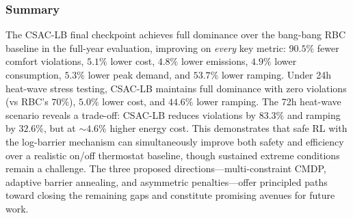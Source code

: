 \subsubsection{Summary}

The CSAC-LB final checkpoint achieves full dominance over the bang-bang RBC
baseline in the full-year evaluation, improving on \emph{every} key metric:
$90.5\%$ fewer comfort violations, $5.1\%$ lower cost, $4.8\%$ lower
emissions, $4.9\%$ lower consumption, $5.3\%$ lower peak demand, and $53.7\%$
lower ramping.  Under 24h heat-wave stress testing, CSAC-LB maintains full
dominance with zero violations (vs RBC's $70\%$), $5.0\%$ lower cost, and
$44.6\%$ lower ramping.  The 72h heat-wave scenario reveals a trade-off:
CSAC-LB reduces violations by $83.3\%$ and ramping by $32.6\%$, but at
$\sim$$4.6\%$ higher energy cost.  This demonstrates that safe RL with the log-barrier
mechanism can simultaneously improve both safety and efficiency over a
realistic on/off thermostat baseline, though sustained extreme conditions
remain a challenge.  The three proposed directions---multi-constraint CMDP,
adaptive barrier annealing, and asymmetric penalties---offer principled paths
toward closing the remaining gaps and constitute promising avenues for future
work.


